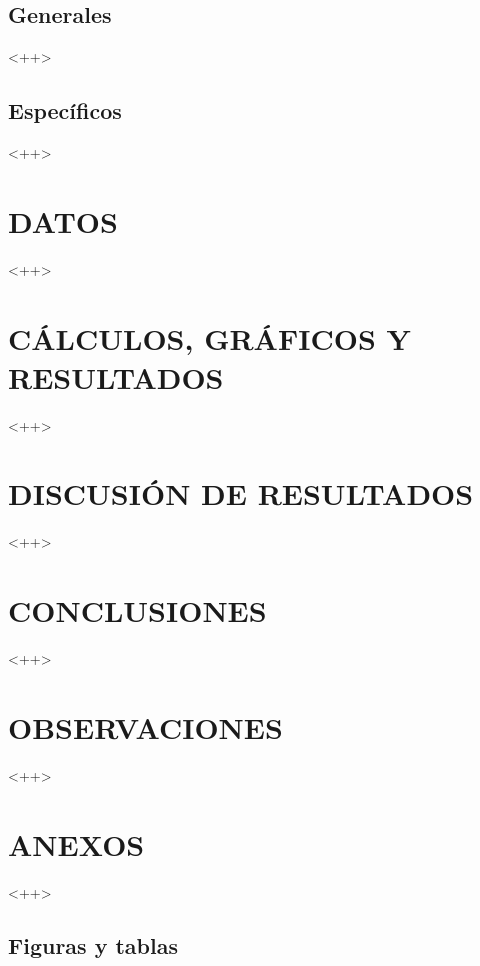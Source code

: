 \documentclass[10pt,conference, twoside,a4paper]{IEEEtran}
\begin{document}
\subsection{Generales}

<++>

\subsection{Específicos}

<++>

\section{\uppercase{Datos}}

<++>



\section{\uppercase{Cálculos, gráficos y resultados}}

<++>


\section{\uppercase{Discusión de resultados}}

<++>


\section{\uppercase{Conclusiones}}

<++>


\section{\uppercase{Observaciones}}

<++>


\section{\uppercase{Anexos}}

<++>




\subsection{Figuras y tablas}
\end{document}
